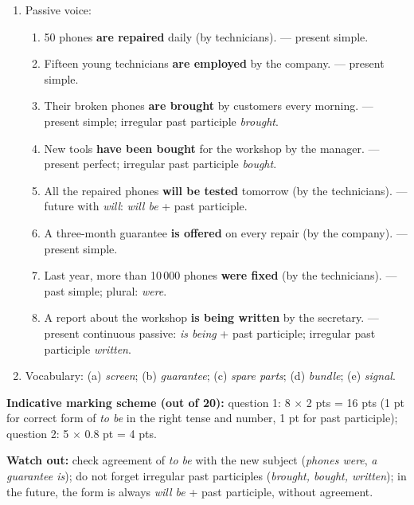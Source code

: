 \documentclass[11pt]{article}
\begin{document}
\begin{corrige}
\begin{enumerate}
\item Passive voice:
\begin{enumerate}
\item 50 phones \textbf{are repaired} daily (by technicians). --- present simple.
\item Fifteen young technicians \textbf{are employed} by the company. --- present simple.
\item Their broken phones \textbf{are brought} by customers every morning. --- present simple; irregular past participle \emph{brought}.
\item New tools \textbf{have been bought} for the workshop by the manager. --- present perfect; irregular past participle \emph{bought}.
\item All the repaired phones \textbf{will be tested} tomorrow (by the technicians). --- future with \emph{will}: \emph{will be} + past participle.
\item A three-month guarantee \textbf{is offered} on every repair (by the company). --- present simple.
\item Last year, more than 10\,000 phones \textbf{were fixed} (by the technicians). --- past simple; plural: \emph{were}.
\item A report about the workshop \textbf{is being written} by the secretary. --- present continuous passive: \emph{is being} + past participle; irregular past participle \emph{written}.
\end{enumerate}
\item Vocabulary: (a) \emph{screen}; (b) \emph{guarantee}; (c) \emph{spare parts}; (d) \emph{bundle}; (e) \emph{signal}.
\end{enumerate}
\textbf{Indicative marking scheme (out of 20):} question 1: 8 $\times$ 2 pts = 16 pts (1 pt for correct form of \emph{to be} in the right tense and number, 1 pt for past participle); question 2: 5 $\times$ 0.8 pt = 4 pts.

\textbf{Watch out:} check agreement of \emph{to be} with the new subject (\emph{phones were}, \emph{a guarantee is}); do not forget irregular past participles (\emph{brought, bought, written}); in the future, the form is always \emph{will be} + past participle, without agreement.
\end{corrige}
\end{document}
